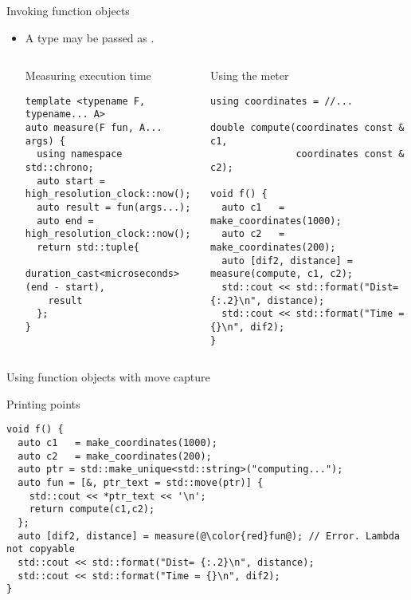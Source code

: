 \begin{frame}[t,fragile]{Invoking function objects}
\begin{itemize}
  \item A  type may be passed as .
\begin{columns}[T]

\begin{block}{Measuring execution time}
\begin{lstlisting}
template <typename F, typename... A>
auto measure(F fun, A... args) {
  using namespace std::chrono;
  auto start = high_resolution_clock::now();
  auto result = fun(args...);
  auto end = high_resolution_clock::now();
  return std::tuple{
    duration_cast<microseconds>(end - start), 
    result
  };
}
\end{lstlisting}
\end{block}

\begin{block}{Using the meter}
\begin{lstlisting}
using coordinates = //...

double compute(coordinates const & c1, 
               coordinates const & c2);

void f() {
  auto c1   = make_coordinates(1000); 
  auto c2   = make_coordinates(200); 
  auto [dif2, distance] = measure(compute, c1, c2);
  std::cout << std::format("Dist= {:.2}\n", distance);
  std::cout << std::format("Time = {}\n", dif2);
}
\end{lstlisting}
\end{block}

\end{columns}

\end{itemize}
\end{frame}


\begin{frame}[t,fragile]{Using function objects with move capture}

\begin{block}{Printing points}
\begin{lstlisting}[escapechar=@]
void f() {
  auto c1   = make_coordinates(1000); 
  auto c2   = make_coordinates(200); 
  auto ptr = std::make_unique<std::string>("computing...");
  auto fun = [&, ptr_text = std::move(ptr)] {
    std::cout << *ptr_text << '\n';
    return compute(c1,c2);
  };
  auto [dif2, distance] = measure(@\color{red}fun@); // Error. Lambda not copyable
  std::cout << std::format("Dist= {:.2}\n", distance);
  std::cout << std::format("Time = {}\n", dif2);
}
\end{lstlisting}
\end{block}
\end{frame}

